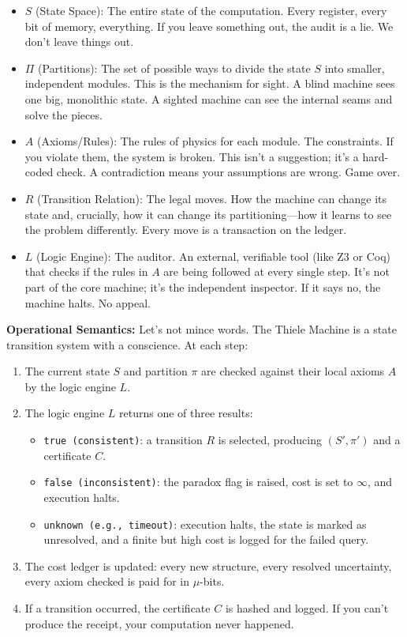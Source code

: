 \documentclass[11pt]{article}
\begin{document}
\begin{itemize}
  \item $S$ (State Space): The entire state of the computation. Every register, every bit of memory, everything. If you leave something out, the audit is a lie. We don't leave things out.
  \item $\Pi$ (Partitions): The set of possible ways to divide the state $S$ into smaller, independent modules. This is the mechanism for sight. A blind machine sees one big, monolithic state. A sighted machine can see the internal seams and solve the pieces.
  \item $A$ (Axioms/Rules): The rules of physics for each module. The constraints. If you violate them, the system is broken. This isn't a suggestion; it's a hard-coded check. A contradiction means your assumptions are wrong. Game over.
  \item $R$ (Transition Relation): The legal moves. How the machine can change its state and, crucially, how it can change its partitioning—how it learns to see the problem differently. Every move is a transaction on the ledger.
  \item $L$ (Logic Engine): The auditor. An external, verifiable tool (like Z3 or Coq) that checks if the rules in $A$ are being followed at every single step. It's not part of the core machine; it's the independent inspector. If it says no, the machine halts. No appeal.
\end{itemize}

\textbf{Operational Semantics:}
Let’s not mince words. The Thiele Machine is a state transition system with a conscience. At each step:
\begin{enumerate}
  \item The current state $S$ and partition $\pi$ are checked against their local axioms $A$ by the logic engine $L$.
  \item The logic engine $L$ returns one of three results:
    \begin{itemize}
      \item \texttt{true (consistent)}: a transition $R$ is selected, producing $(S', \pi')$ and a certificate $C$.
      \item \texttt{false (inconsistent)}: the paradox flag is raised, cost is set to $\infty$, and execution halts.
      \item \texttt{unknown (e.g., timeout)}: execution halts, the state is marked as unresolved, and a finite but high cost is logged for the failed query.
    \end{itemize}
  \item The cost ledger is updated: every new structure, every resolved uncertainty, every axiom checked is paid for in $\mu$-bits.
  \item If a transition occurred, the certificate $C$ is hashed and logged. If you can’t produce the receipt, your computation never happened.
\end{enumerate}
\end{document}

